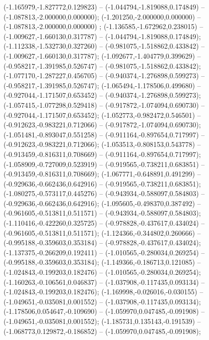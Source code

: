  (-1.165979,-1.827772,0.129823) -- (-1.044794,-1.819088,0.174849) -- (-1.087813,-2.000000,0.000000);
 (-1.201250,-2.000000,0.000000) -- (-1.087813,-2.000000,0.000000) ;
 (-1.136585,-1.672962,0.238015) -- (-1.009627,-1.660130,0.317787) -- (-1.044794,-1.819088,0.174849);
 (-1.112338,-1.532730,0.327260) -- (-0.981075,-1.518862,0.433842) -- (-1.009627,-1.660130,0.317787);
 (-1.092677,-1.404779,0.399629) -- (-0.958217,-1.391985,0.526747) -- (-0.981075,-1.518862,0.433842);
 (-1.077170,-1.287227,0.456705) -- (-0.940374,-1.276898,0.599273) -- (-0.958217,-1.391985,0.526747);
 (-1.065494,-1.178506,0.499680) -- (-0.927044,-1.171507,0.653452) -- (-0.940374,-1.276898,0.599273);
 (-1.057415,-1.077298,0.529418) -- (-0.917872,-1.074094,0.690730) -- (-0.927044,-1.171507,0.653452);
 (-1.052773,-0.982472,0.546501) -- (-0.912623,-0.983221,0.712066) -- (-0.917872,-1.074094,0.690730);
 (-1.051481,-0.893047,0.551258) -- (-0.911164,-0.897654,0.717997) -- (-0.912623,-0.983221,0.712066);
 (-1.053513,-0.808153,0.543778) -- (-0.913459,-0.816311,0.708669) -- (-0.911164,-0.897654,0.717997);
 (-1.058909,-0.727009,0.523919) -- (-0.919565,-0.738211,0.683851) -- (-0.913459,-0.816311,0.708669);
 (-1.067771,-0.648891,0.491299) -- (-0.929636,-0.662436,0.642916) -- (-0.919565,-0.738211,0.683851);
 (-1.080275,-0.573117,0.445276) -- (-0.943934,-0.588097,0.584803) -- (-0.929636,-0.662436,0.642916);
 (-1.095605,-0.498370,0.387492) -- (-0.961605,-0.513811,0.511571) -- (-0.943934,-0.588097,0.584803);
 (-1.110416,-0.422260,0.325725) -- (-0.978828,-0.437617,0.434024) -- (-0.961605,-0.513811,0.511571);
 (-1.124366,-0.344802,0.260666) -- (-0.995188,-0.359603,0.353184) -- (-0.978828,-0.437617,0.434024);
 (-1.137375,-0.266209,0.192411) -- (-1.010565,-0.280034,0.269254) -- (-0.995188,-0.359603,0.353184);
 (-1.149366,-0.186713,0.121085) -- (-1.024843,-0.199203,0.182476) -- (-1.010565,-0.280034,0.269254);
 (-1.160263,-0.106561,0.046837) -- (-1.037908,-0.117435,0.093134) -- (-1.024843,-0.199203,0.182476);
 (-1.169998,-0.026016,-0.030155) -- (-1.049651,-0.035081,0.001552) -- (-1.037908,-0.117435,0.093134);
 (-1.178506,0.054647,-0.109690) -- (-1.059970,0.047485,-0.091908) -- (-1.049651,-0.035081,0.001552);
 (-1.185731,0.135143,-0.191539) -- (-1.068773,0.129872,-0.186852) -- (-1.059970,0.047485,-0.091908);
